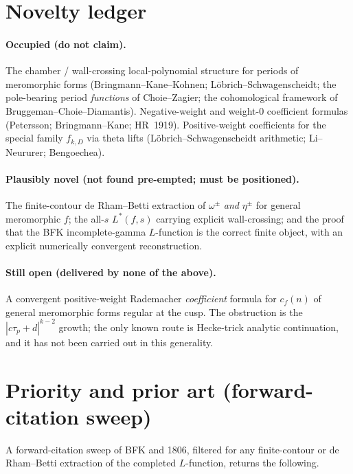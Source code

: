 \documentclass[11pt]{article}
\newcommand{\Lstar}{L^{*}}
\newcommand{\taup}{\tau_p}
\begin{document}
\section{Novelty ledger}

\paragraph{Occupied (do not claim).}
The chamber / wall-crossing local-polynomial structure for periods of meromorphic forms
(Bringmann--Kane--Kohnen; L\"obrich--Schwagenscheidt; the pole-bearing period
\emph{functions} of Choie--Zagier; the cohomological framework of Bruggeman--Choie--Diamantis).
Negative-weight and weight-$0$ coefficient formulas (Petersson; Bringmann--Kane; HR~1919).
Positive-weight coefficients for the special family $f_{k,D}$ via theta lifts
(L\"obrich--Schwagenscheidt arithmetic; Li--Neururer; Bengoechea).

\paragraph{Plausibly novel (not found pre-empted; must be positioned).}
The finite-contour de Rham--Betti extraction of $\omega^{\pm}$ \emph{and} $\eta^{\pm}$ for
general meromorphic $f$; the all-$s$ $\Lstar(f,s)$ carrying explicit wall-crossing; and the
proof that the BFK incomplete-gamma $L$-function is the correct finite object, with an
explicit numerically convergent reconstruction.

\paragraph{Still open (delivered by none of the above).}
A convergent positive-weight Rademacher \emph{coefficient} formula for $c_f(n)$ of general
meromorphic forms regular at the cusp. The obstruction is the $|c\taup+d|^{k-2}$ growth;
the only known route is Hecke-trick analytic continuation, and it has not been carried out
in this generality.

\section{Priority and prior art (forward-citation sweep)}

A forward-citation sweep of BFK and 1806, filtered for any finite-contour or
de Rham--Betti extraction of the completed $L$-function, returns the following.
\end{document}
